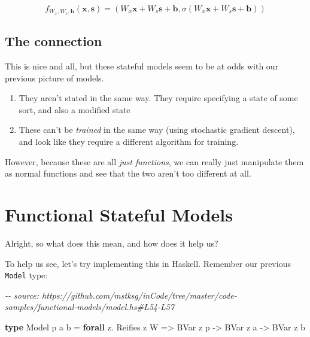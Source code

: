 \documentclass[]{article}
\newenvironment{Shaded}{}{}
\newcommand{\CommentTok}[1]{\textcolor[rgb]{0.38,0.63,0.69}{\textit{#1}}}
\newcommand{\DataTypeTok}[1]{\textcolor[rgb]{0.56,0.13,0.00}{#1}}
\newcommand{\KeywordTok}[1]{\textcolor[rgb]{0.00,0.44,0.13}{\textbf{#1}}}
\newcommand{\NormalTok}[1]{#1}
\newcommand{\OperatorTok}[1]{\textcolor[rgb]{0.40,0.40,0.40}{#1}}
\newcommand{\OtherTok}[1]{\textcolor[rgb]{0.00,0.44,0.13}{#1}}
\begin{document}
\[
f_{W_x, W_s, \mathbf{b}}(\mathbf{x}, \mathbf{s}) =
  ( W_x \mathbf{x} + W_s \mathbf{s} + \mathbf{b}
  , \sigma(W_x \mathbf{x} + W_s \mathbf{s} + \mathbf{b})
  )
\]

\subsection{The connection}\label{the-connection}

This is nice and all, but these stateful models seem to be at odds with our
previous picture of models.

\begin{enumerate}
\def\labelenumi{\arabic{enumi}.}
\tightlist
\item
  They aren't stated in the same way. They require specifying a state of some
  sort, and also a modified state
\item
  These can't be \emph{trained} in the same way (using stochastic gradient
  descent), and look like they require a different algorithm for training.
\end{enumerate}

However, because these are all \emph{just functions}, we can really just
manipulate them as normal functions and see that the two aren't too different at
all.

\section{Functional Stateful Models}\label{functional-stateful-models}

Alright, so what does this mean, and how does it help us?

To help us see, let's try implementing this in Haskell. Remember our previous
\texttt{Model} type:

\begin{Shaded}
\begin{Highlighting}[]
\CommentTok{{-}{-} source: https://github.com/mstksg/inCode/tree/master/code{-}samples/functional{-}models/model.hs\#L54{-}L57}

\KeywordTok{type} \DataTypeTok{Model}\NormalTok{ p a b }\OtherTok{=} \KeywordTok{forall}\NormalTok{ z}\OperatorTok{.} \DataTypeTok{Reifies}\NormalTok{ z }\DataTypeTok{W}
                \OtherTok{=\textgreater{}} \DataTypeTok{BVar}\NormalTok{ z p}
                \OtherTok{{-}\textgreater{}} \DataTypeTok{BVar}\NormalTok{ z a}
                \OtherTok{{-}\textgreater{}} \DataTypeTok{BVar}\NormalTok{ z b}
\end{Highlighting}
\end{Shaded}
\end{document}
